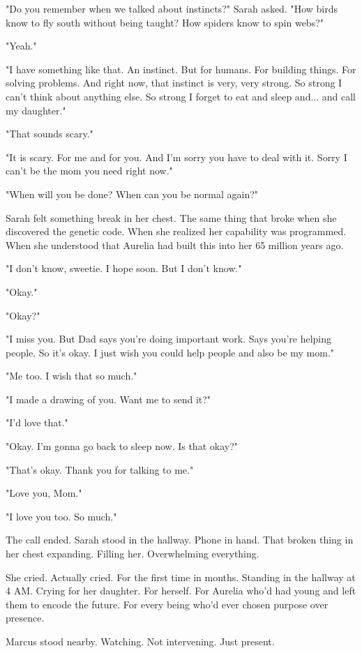 "Do you remember when we talked about instincts?" Sarah asked. "How birds know to fly south without being taught? How spiders know to spin webs?"

"Yeah."

"I have something like that. An instinct. But for humans. For building things. For solving problems. And right now, that instinct is very, very strong. So strong I can't think about anything else. So strong I forget to eat and sleep and... and call my daughter."

"That sounds scary."

"It is scary. For me and for you. And I'm sorry you have to deal with it. Sorry I can't be the mom you need right now."

"When will you be done? When can you be normal again?"

Sarah felt something break in her chest. The same thing that broke when she discovered the genetic code. When she realized her capability was programmed. When she understood that Aurelia had built this into her 65 million years ago.

"I don't know, sweetie. I hope soon. But I don't know."

"Okay."

"Okay?"

"I miss you. But Dad says you're doing important work. Says you're helping people. So it's okay. I just wish you could help people and also be my mom."

"Me too. I wish that so much."

"I made a drawing of you. Want me to send it?"

"I'd love that."

"Okay. I'm gonna go back to sleep now. Is that okay?"

"That's okay. Thank you for talking to me."

"Love you, Mom."

"I love you too. So much."

The call ended. Sarah stood in the hallway. Phone in hand. That broken thing in her chest expanding. Filling her. Overwhelming everything.

She cried. Actually cried. For the first time in months. Standing in the hallway at 4 AM. Crying for her daughter. For herself. For Aurelia who'd had young and left them to encode the future. For every being who'd ever chosen purpose over presence.

Marcus stood nearby. Watching. Not intervening. Just present.

